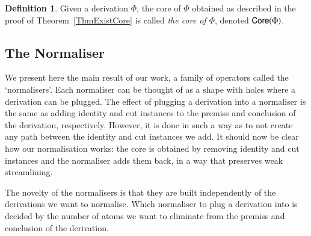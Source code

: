 \documentclass[a4paper]{amsart}
\theoremstyle{definition}
\newtheorem{definition}[theorem]{Definition}
\theoremstyle{remark}
\begin{document}

\begin{definition}
Given a derivation $\Phi$, the core of $\Phi$ obtained as described in the proof of Theorem~\ref{ThmExistCore} is called \emph{the core of $\Phi$}, denoted $\mathsf{Core}(\Phi)$.
\end{definition}

\subsection{The Normaliser}

We present here the main result of our work, a family of operators called the `normalisers'. Each normaliser can be thought of as a shape with holes where a derivation can be plugged. The effect of plugging a derivation into a normaliser is the same as adding identity and cut instances to the premiss and conclusion of the derivation, respectively. However, it is done in such a way as to not create any path between the identity and cut instances we add. It should now be clear how our normalisation works: the core is obtained by removing identity and cut instances and the normaliser adds them back, in a way that preserves weak streamlining.


The novelty of the normalisers is that they are built independently of the derivations we want to normalise. Which normaliser to plug a derivation into is decided by the number of atoms we want to eliminate from the premiss and conclusion of the derivation.

\end{document}
